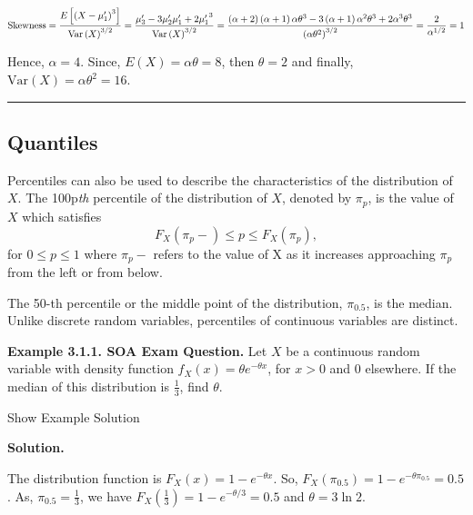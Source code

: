 \documentclass[]{book}
\theoremstyle{definition}
\theoremstyle{definition}
\theoremstyle{definition}
\theoremstyle{remark}
\begin{document}
\[\text{Skewness}  = \frac{E\left\lbrack {(X - \mu_{1}^{\prime})}^{3} \right\rbrack}{{\mathrm{Var}\left( X \right)}^{3/2}} = \frac{\mu_{3}^{\prime} - 3\mu_{2}^{\prime}\mu_{1}^{\prime} + 2{\mu_{1}^{\prime}}^{3}}{{\mathrm{Var}\left( X \right)}^{3/2}} \\
 = \frac{\left( \alpha + 2 \right)\left( \alpha + 1 \right)\alpha\theta^{3} - 3\left( \alpha + 1 \right)\alpha^{2}\theta^{3} + 2\alpha^{3}\theta^{3}}{\left( \alpha\theta^{2} \right)^{3/2}} = \frac{2}{\alpha^{1/2}} = 1\]

Hence, \(\alpha = 4\). Since, \(E\left( X \right) = \alpha\theta = 8\),
then \(\theta = 2\) and finally,
\(\mathrm{Var}\left( X \right) = \alpha\theta^{2} = 16\).

\begin{center}\rule{0.5\linewidth}{\linethickness}\end{center}

\subsection{Quantiles}\label{quantiles}

Percentiles can also be used to describe the characteristics of the
distribution of \(X\). The 100p\emph{th} percentile of the distribution
of \(X\), denoted by \(\pi_{p}\), is the value of \(X\) which satisfies
\[F_{X}\left( {\pi_{p}}- \right) \leq p \leq F_{X}\left( \pi_{p} \right) ,\]
for \(0 \leq p \leq 1\) where \(\pi_{p}-\) refers to the value of X as
it increases approaching \(\pi_{p}\) from the left or from below.

The 50-th percentile or the middle point of the distribution,
\(\pi_{0.5}\), is the median. Unlike discrete random variables,
percentiles of continuous variables are distinct.

\textbf{Example 3.1.1. SOA Exam Question.} Let \(X\) be a continuous
random variable with density function
\(f_{X}\left( x \right) = \theta e^{- \theta x}\), for \(x > 0\) and 0
elsewhere. If the median of this distribution is \(\frac{1}{3}\), find
\(\theta\).

Show Example Solution

\hypertarget{toggleExampleLoss.1.2}{}
\textbf{Solution.}

The distribution function is
\(F_{X}\left( x \right) = 1 - e^{- \theta x}\). So,
\(F_{X}\left( \pi_{0.5} \right) = 1 - e^{- \theta\pi_{0.5}} = 0.5\). As,
\(\pi_{0.5} = \frac{1}{3}\), we have
\(F_X\left(\frac{1}{3}\right) = 1 - e^{-\theta / 3} = 0.5\) and
\(\theta = 3 \ln 2\).
\end{document}
